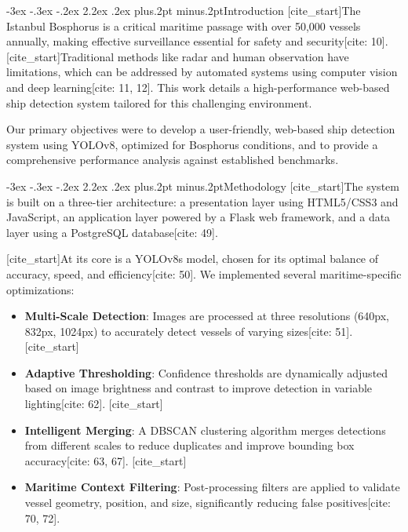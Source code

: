 \documentclass[twoside]{article}
\makeatletter
\def\section{\@startsection{section}{1}{\z@}%
 {-3ex \@plus -.3ex \@minus -.2ex}%
 {2.2ex \@plus.2ex}%
{\normalfont\normalsize\protect\baselineskip=14.5pt plus.2pt minus.2pt\bfseries}}
\makeatother
\begin{document}
\begin{multicols}{2}

\section{Introduction}
[cite_start]The Istanbul Bosphorus is a critical maritime passage with over 50,000 vessels annually, making effective surveillance essential for safety and security[cite: 10]. [cite_start]Traditional methods like radar and human observation have limitations, which can be addressed by automated systems using computer vision and deep learning[cite: 11, 12]. This work details a high-performance web-based ship detection system tailored for this challenging environment.

Our primary objectives were to develop a user-friendly, web-based ship detection system using YOLOv8, optimized for Bosphorus conditions, and to provide a comprehensive performance analysis against established benchmarks.

\section{Methodology}
[cite_start]The system is built on a three-tier architecture: a presentation layer using HTML5/CSS3 and JavaScript, an application layer powered by a Flask web framework, and a data layer using a PostgreSQL database[cite: 49].

[cite_start]At its core is a YOLOv8s model, chosen for its optimal balance of accuracy, speed, and efficiency[cite: 50]. We implemented several maritime-specific optimizations:
\begin{itemize}
    [cite_start]\item \textbf{Multi-Scale Detection}: Images are processed at three resolutions (640px, 832px, 1024px) to accurately detect vessels of varying sizes[cite: 51].
    [cite_start]\item \textbf{Adaptive Thresholding}: Confidence thresholds are dynamically adjusted based on image brightness and contrast to improve detection in variable lighting[cite: 62].
    [cite_start]\item \textbf{Intelligent Merging}: A DBSCAN clustering algorithm merges detections from different scales to reduce duplicates and improve bounding box accuracy[cite: 63, 67].
    [cite_start]\item \textbf{Maritime Context Filtering}: Post-processing filters are applied to validate vessel geometry, position, and size, significantly reducing false positives[cite: 70, 72].
\end{itemize}


\end{multicols}
\end{document}
